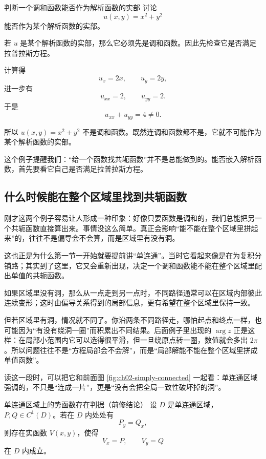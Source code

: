 \begin{lizi}{判断一个调和函数能否作为解析函数的实部}{}
讨论
\[
    u(x,y)=x^2+y^2
\]
能否作为某个解析函数的实部。

\begin{jie}
若 $u$ 是某个解析函数的实部，那么它必须先是调和函数。因此先检查它是否满足拉普拉斯方程。

计算得
\[
    u_x=2x,\qquad u_y=2y,
\]
进一步有
\[
    u_{xx}=2,\qquad u_{yy}=2.
\]
于是
\[
    u_{xx}+u_{yy}=4\neq 0.
\]

所以 $u(x,y)=x^2+y^2$ 不是调和函数。既然连调和函数都不是，它就不可能作为某个解析函数的实部。

这个例子提醒我们：``给一个函数找共轭函数''并不是总能做到的。能否嵌入解析函数，首先要看它自己是否满足拉普拉斯方程。
\end{jie}
\end{lizi}

\subsection{什么时候能在整个区域里找到共轭函数}

刚才这两个例子容易让人形成一种印象：好像只要函数是调和的，我们总能把另一个共轭函数直接算出来。事情没这么简单。真正会影响``能不能在整个区域里拼起来''的，往往不是偏导会不会算，而是区域里有没有洞。

这也正是为什么第一节一开始就要提前讲``单连通''。当时它看起来像是在为复积分铺路；其实到了这里，它又会重新出现，决定一个调和函数能不能在整个区域里配出单值的共轭函数。

\begin{tishi}
如果区域里没有洞，那么从一点走到另一点时，不同路径通常可以在区域内部彼此连续变形；这时由偏导关系得到的局部信息，更有希望在整个区域里保持一致。

但若区域里有洞，情况就不同了。你沿两条不同路径走，哪怕起点和终点一样，也可能因为``有没有绕洞一圈''而积累出不同结果。后面例子里出现的 $\arg z$ 正是这样：在局部小范围内它可以选得很平滑，但一旦绕原点转一圈，数值就会多出 $2\pi$。所以问题往往不是``方程局部会不会解''，而是``局部解能不能在整个区域里拼成单值函数''。

读这一段时，可以把它和前面图 \ref{fig:ch02-simply-connected} 一起看：单连通区域强调的，不只是``连成一片''，更是``没有会把全局一致性破坏掉的洞''。
\end{tishi}

\begin{yinli}{单连通区域上的势函数存在判据（前修结论）}{}
设 $D$ 是单连通区域，$P,Q\in C^1(D)$。若在 $D$ 内处处有
\[
    P_y=Q_x,
\]
则存在实函数 $V(x,y)$，使得
\[
    V_x=P,\qquad V_y=Q
\]
在 $D$ 内成立。
\end{yinli}

